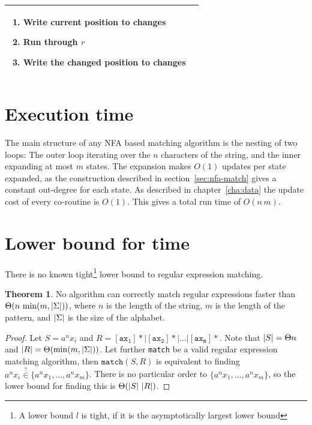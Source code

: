\documentclass[11pt,a4paper,twoside,openright]{Thesis}
\theoremstyle{definition}
\newtheorem{thm}{Theorem}
\newcommand{\seclabel}[1]{\label{sec:#1}}
\begin{document}
\begin{center}
\begin{tabular}{p{5cm}|p{7cm}}
    \begin{enumerate}
      \item Write current position to changes
      \item Run through $r$
      \item Write the changed position to changes
    \end{enumerate} \\
    \hline \hline
  \end{tabular}
\end{center}

\section{Execution time}
The main structure of any NFA based matching algorithm is the nesting of two 
loops: The outer loop iterating over the $n$ characters of the string, and 
the inner expanding at most $m$ states. The expansion makes $O(1)$ updates 
per state expanded, as the construction described in
section~\ref{sec:nfa-match} gives a constant out-degree for each state. As
described in chapter~\ref{cha:data} the update cost of every co-routine is
$O(1)$. This gives a total run time of $O(n\, m)$.

\section{Lower bound for time}\seclabel{lower-bound}
There is no known tight\footnote{A lower bound $l$ is tight, if it is the 
asymptotically largest lower bound} lower bound to regular expression 
matching.

\begin{thm}
  No algorithm can correctly match regular expressions faster than 
  $\Theta(n\, \min(m, \left|\Sigma\right|))$, where $n$ is the length of the string, 
  $m$ is the length of the pattern, and $\left|\Sigma\right|$ is the size of the alphabet.
\end{thm}
\begin{proof}
  Let $S=a^nx_i$ and $R=\mathtt{[ax_1]*|[ax_2]*|\dots|[ax_m]*}$. Note that 
  $\left|S\right| = \Theta{n}$ and $\left|R\right|=\Theta(\min(m, \left|\Sigma\right|))$. Let 
  further \texttt{match} be a valid regular expression matching algorithm, 
  then $\mathtt{match}(S, R)$ is equivalent to finding 
  $a^nx_i\stackrel{?}{\in} \{a^nx_1, \dots, a^nx_m\}$. There is no particular order to 
  $\{a^nx_1, \dots, a^nx_m\}$, so the lower bound for finding this is 
  $\Theta(\left|S\right|\, \left|R\right|)$.
\end{proof}
\end{document}
